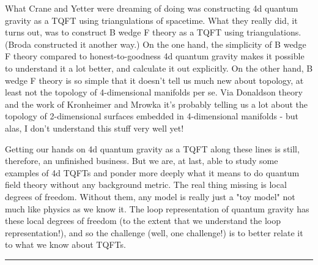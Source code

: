 What Crane and Yetter were dreaming of doing was constructing 4d quantum
gravity as a TQFT using triangulations of spacetime.  What they really
did, it turns out, was to construct B wedge F theory as a TQFT using
triangulations.  (Broda constructed it another way.)  On the one hand, the
simplicity of B wedge F theory compared to honest-to-goodness 4d quantum
gravity makes it possible to understand it a lot better, and calculate
it out explicitly.   On the other hand, B wedge F theory is so simple
that it doesn't tell us much new about topology, at least not the
topology of 4-dimensional manifolds per se.   Via Donaldson theory and
the work of Kronheimer and Mrowka it's probably telling us a lot about
the topology of 2-dimensional surfaces embedded in 4-dimensional
manifolds - but alas, I don't understand this stuff very well yet!

Getting our hands on 4d quantum gravity as a TQFT along these lines is
still, therefore, an unfinished business.  But we are, at last, able to
study some examples of 4d TQFTs and ponder more deeply what it means to
do quantum field theory without any background metric.  The real thing
missing is local degrees of freedom.  Without them, any model is really
just a "toy model" not much like physics as we know it.  The loop
representation of quantum gravity has these local degrees of freedom (to
the extent that we understand the loop representation!), and so the
challenge (well, one challenge!) is to better relate it to what we know
about TQFTs.  
\par\noindent\rule{\textwidth}{0.4pt}

